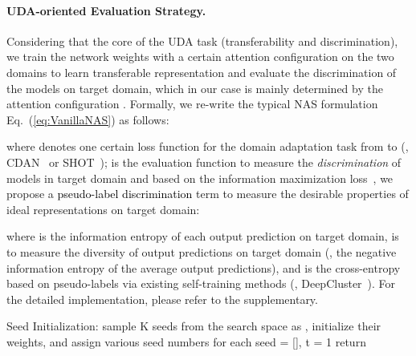 \documentclass[10pt,twocolumn,letterpaper]{article}
\begin{document}
\vspace{-3mm}
\paragraph{UDA-oriented Evaluation Strategy.}


Considering that the core of the UDA task (transferability and discrimination), we train the network weights with a certain attention configuration  on the two domains to learn transferable representation and evaluate the discrimination of the models on target domain, which in our case is mainly determined by the attention configuration .
Formally, we re-write the typical NAS formulation Eq.~(\ref{eq:VanillaNAS}) as follows:

where  denotes one certain loss function for the domain adaptation task from  to  (\eg, CDAN~\cite{long2018CDAN} or SHOT~\cite{liang2020shot});  is the evaluation function to measure the \textit{discrimination} of models in target domain and based on the information maximization loss~\cite{gomes2010discriminative,hu2017learning}, we propose a \textcolor{black}{pseudo-label discrimination} term to measure the desirable properties of ideal representations on target domain:

where  is the information entropy of each output prediction on target domain,  is to measure the diversity of output predictions on target domain (\eg, the negative information entropy of the average output predictions), and  is the cross-entropy based on pseudo-labels  via existing self-training methods (\eg, DeepCluster~\cite{caron2018DeepCluster}). For the detailed implementation, please refer to the supplementary.


\begin{algorithm}[t]
    \small
    {
    \SetAlgoLined
    Seed Initialization: sample K seeds from the search space  as , initialize their weights, and assign various seed numbers for each seed\;
     = [], t = 1\;
    return \;
    \caption{\iMethod}
    \label{alg:NAS4DA}
    }
\end{algorithm}
\end{document}
